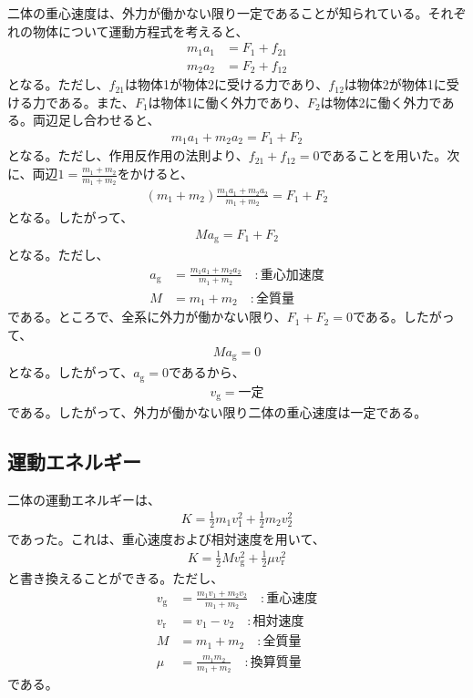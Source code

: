\documentclass[a4paper,11pt]{jsarticle}
\numberwithin{equation}{section}
\begin{document}
二体の重心速度は、外力が働かない限り一定であることが知られている。それぞれの物体について運動方程式を考えると、
\begin{align}
    m_1a_1 &= F_{\text{1}} + f_{21} \\
    m_2a_2 &= F_{\text{2}} + f_{12}
\end{align}
となる。ただし、$f_{21}$は物体1が物体2に受ける力であり、$f_{12}$は物体2が物体1に受ける力である。また、$F_{\text{1}}$は物体1に働く外力であり、$F_{\text{2}}$は物体2に働く外力である。両辺足し合わせると、
\begin{align}
        m_1a_1 + m_2a_2 = F_{\text{1}} + F_{\text{2}}
\end{align}
となる。ただし、作用反作用の法則より、$f_{21} + f_{12} = 0$であることを用いた。次に、両辺$1 = \frac{m_1 + m_2}{m_1 + m_2}$をかけると、
\begin{align}
        (m_1 + m_2)\frac{m_1a_1 + m_2a_2}{m_1 + m_2} = F_{\text{1}} + F_{\text{2}}
\end{align}
となる。したがって、
\begin{align}
        Ma_{\text{g}} = F_{\text{1}} + F_{\text{2}}
\end{align}
となる。ただし、
\begin{align}
        a_{\text{g}} &= \frac{m_1a_1 + m_2a_2}{m_1 + m_2} \quad :\text{重心加速度} \\
        M &= m_1 + m_2 \quad :\text{全質量}
\end{align}
である。ところで、全系に外力が働かない限り、$F_{\text{1}} + F_{\text{2}} = 0$である。したがって、
\begin{align}
    Ma_{\text{g}} = 0
\end{align}
となる。したがって、$a_{\text{g}} = 0$であるから、
\begin{align}
    v_{\text{g}} = \text{一定}
\end{align}
である。したがって、外力が働かない限り二体の重心速度は一定である。

\subsection{運動エネルギー}
二体の運動エネルギーは、
\begin{align}
    K = \frac{1}{2}m_1v_1^2 + \frac{1}{2}m_2v_2^2
\end{align}
であった。これは、重心速度および相対速度を用いて、
\begin{align}
    K = \frac{1}{2}Mv_{\text{g}}^2 + \frac{1}{2}\mu v_{\text{r}}^2
\end{align}
と書き換えることができる。ただし、
\begin{align}
    v_{\text{g}} &= \frac{m_1v_1 + m_2v_2}{m_1 + m_2}\quad : \text{重心速度} \\
    v_{\text{r}} &= v_1 - v_2\quad : \text{相対速度} \\
    M &= m_1 + m_2 \quad: \text{全質量} \\
    \mu &= \frac{m_1m_2}{m_1 + m_2} \quad: \text{換算質量}
\end{align}
である。
\end{document}
